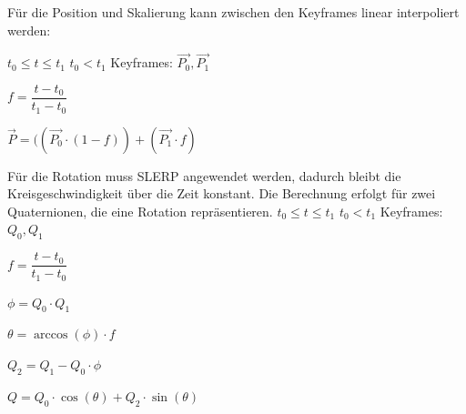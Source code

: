 Für die Position und Skalierung kann zwischen den Keyframes linear interpoliert werden:

$t_{0} \leq t \leq t_{1}$ \qquad $t_{0} < t_{1}$ \qquad Keyframes: $\overrightarrow{P_{0}}, \overrightarrow{P_{1}}$

$f = \dfrac{t - t_{0}}{t_{1} - t_{0}}$

$\overrightarrow{P} = ((\overrightarrow{P_{0}} \cdot (1 - f)) + (\overrightarrow{P_{1}} \cdot f)$

Für die Rotation muss \ac{SLERP} \cite{WikiSlerp} angewendet werden, dadurch bleibt die Kreisgeschwindigkeit über die Zeit konstant. Die Berechnung erfolgt für zwei Quaternionen, die eine Rotation repräsentieren.
$t_{0} \leq t \leq t_{1}$ \qquad $t_{0} < t_{1}$ \qquad Keyframes: $Q_{0}, Q_{1}$

$f = \dfrac{t - t_{0}}{t_{1} - t_{0}}$

$\phi = Q_{0} \cdot Q_{1}$

$\theta = \arccos(\phi) \cdot f$

$Q_{2} = Q_{1} - Q_{0} \cdot \phi$

$Q = Q_{0} \cdot \cos(\theta) + Q_{2} \cdot \sin(\theta)$

